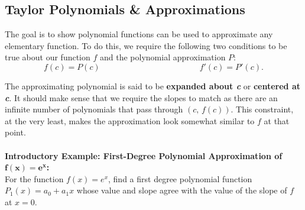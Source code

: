 \documentclass[addpoints, 12pt]{exam}
\begin{document}
\newpage
{}
\subsection*{Taylor Polynomials \& Approximations}
The goal is to show polynomial functions can be used to approximate any elementary function. To do this, we require the following two conditions to be true about our function $f$ and the polynomial approximation $P$:
\[f(c)=P(c)\hspace{2in}f'(c)=P'(c).\]

\begin{center}
\end{center}


The approximating polynomial is said to be \textbf{expanded about \textit{c}} or \textbf{centered at \textit{c}}. It should make sense that we require the slopes to match as there are an infinite number of polynomials that pass through $(c,\,f(c))$. This constraint, at the very least, makes the approximation look somewhat similar to $f$ at that point.\\
\\

\noindent\textbf{Introductory Example: First-Degree Polynomial Approximation of $\mathbf{f(x)=e^{x}}$: }\\
For the function $f(x)=e^x$, find a first degree polynomial function $P_1(x)=a_0+a_1 x$ whose value and slope agree with the value of the slope of $f$ at $x=0$.



\end{document}
